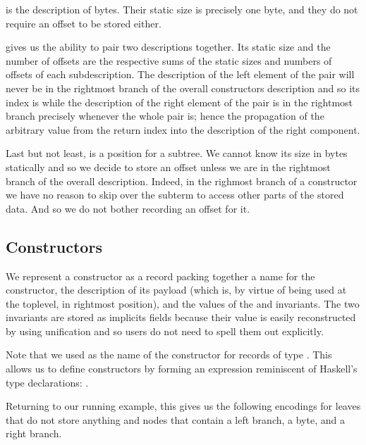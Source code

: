  is the description of bytes.
%
Their static size is precisely one byte, and they do not require an
offset to be stored either.

 gives us the ability to pair two descriptions together.
Its static size and the number of offsets are the respective sums of the
static sizes and numbers of offsets of each subdescription.
%
The description of the left element of the pair will never be in the
rightmost branch of the overall constructors description and so its
index is  while the description of the right element
of the pair is in the rightmost branch precisely whenever the whole pair
is; hence the propagation of the  arbitrary value from the
return index into the description of the right component.

Last but not least,  is a position for a subtree.
We cannot know its size in bytes statically and so we decide to store
an offset unless we are in the rightmost branch of the overall description.
%
Indeed, in the righmost branch of a constructor we have no reason to
skip over the subterm to access other parts of the stored data. And so we
do not bother recording an offset for it.


\subsection{Constructors}

We represent a constructor as a record packing together
a name for the constructor,
the description of its payload (which is, by virtue of
being used at the toplevel, in rightmost position),
and the values of the  and
 invariants.
%
The two invariants are stored as implicits fields
because their value is easily reconstructed by \idris{}
using unification and so users do not need
to spell them out explicitly.


Note that we used \IdrisData{(::)} as the name of the
constructor for records of type .
This allows us to define constructors by forming an
expression reminiscent of Haskell's type declarations:
 \IdrisData{::} .

Returning to our running example, this gives us the following encodings for
leaves that do not store anything
and nodes that contain a left branch, a byte, and a right branch.

